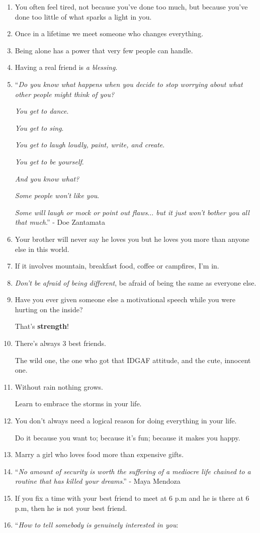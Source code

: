 \documentclass{article}
\numberwithin{equation}{section}
\begin{document}
\begin{enumerate}
    Not everything is about love.
    \item You often feel tired, not because you've done too much, but because you've done too little of what sparks a light in you.
    \item Once in a lifetime we meet someone who changes everything.
    \item Being alone has a power that very few people can handle.
    \item Having a real friend is \textit{a blessing}.
    \item ``\textit{Do you know what happens when you decide to stop worrying about what other people might think of you?}
    
    \textit{You get to dance}.
    
    \textit{You get to sing}.
    
    \textit{You get to laugh loudly, paint, write, and create}.
    
    \textit{You get to be yourself}.
    
    \textit{And you know what?}
    
    \textit{Some people won't like you}.
    
    \textit{Some will laugh or mock or point out flaws$\ldots$ but it just won't bother you all that much}.'' - Doe Zantamata
    \item Your brother will never say he loves you but he loves you more than anyone else in this world.
    \item If it involves mountain, breakfast food, coffee or campfires, I'm in.
    \item \textit{Don't be afraid of being different}, be afraid of being the same as everyone else.
    \item Have you ever given someone else a motivational speech while you were hurting on the inside?
    
    That's \textbf{strength}!
    \item There's always 3 best friends.
    
    The wild one, the one who got that IDGAF attitude, and the cute, innocent one.
    \item Without rain nothing grows.
    
    Learn to embrace the storms in your life.
    \item You don't always need a logical reason for doing everything in your life.
    
    Do it because you want to; because it's fun; because it makes you happy.
    \item Marry a girl who loves food more than expensive gifts.
    \item ``\textit{No amount of security is worth the suffering of a mediocre life chained to a routine that has killed your dreams}.'' - Maya Mendoza
    \item If you fix a time with your best friend to meet at 6 p.m and he is there at 6 p.m, then he is not your best friend.
    \item ``\textit{How to tell somebody is genuinely interested in you}:
    

\end{enumerate}
\end{document}
